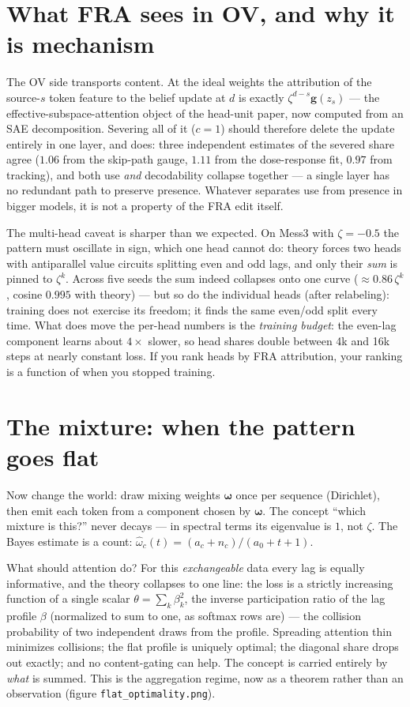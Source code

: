 \documentclass{article}
\newcommand{\gb}{\boldsymbol{g}}
\newcommand{\omegab}{\boldsymbol{\omega}}
\begin{document}
\section{What FRA sees in OV, and why it is mechanism}

The OV side transports content. At the ideal weights the attribution of the
source-$s$ token feature to the belief update at $d$ is exactly
$\zeta^{d-s}\gb(z_s)$ --- the effective-subspace-attention object of the
head-unit paper, now computed from an SAE decomposition. Severing all of it
($c=1$) should therefore delete the update entirely in one layer, and does:
three independent estimates of the severed share agree ($1.06$ from the
skip-path gauge, $1.11$ from the dose-response fit, $0.97$ from tracking),
and both use \emph{and} decodability collapse together --- a single layer
has no redundant path to preserve presence. Whatever separates use from
presence in bigger models, it is not a property of the FRA edit itself.

The multi-head caveat is sharper than we expected. On Mess3 with
$\zeta = -0.5$ the pattern must oscillate in sign, which one head cannot do:
theory forces two heads with antiparallel value circuits splitting even and
odd lags, and only their \emph{sum} is pinned to $\zeta^k$. Across five
seeds the sum indeed collapses onto one curve ($\approx 0.86\,\zeta^k$,
cosine $0.995$ with theory) --- but so do the individual heads (after
relabeling): training does not exercise its freedom; it finds the same
even/odd split every time. What does move the per-head numbers is the
\emph{training budget}: the even-lag component learns about $4\times$
slower, so head shares double between 4k and 16k steps at nearly constant
loss. If you rank heads by FRA attribution, your ranking is a function of
when you stopped training.

\section{The mixture: when the pattern goes flat}

Now change the world: draw mixing weights $\omegab$ once per sequence
(Dirichlet), then emit each token from a component chosen by $\omegab$.
The concept ``which mixture is this?'' never decays --- in spectral terms
its eigenvalue is $1$, not $\zeta$. The Bayes estimate is a count:
$\hat\omega_c(t) = (a_c + n_c)/(a_0 + t + 1)$.

What should attention do? For this \emph{exchangeable} data every lag is
equally informative, and the theory collapses to one line: the loss is a
strictly increasing function of a single scalar
$\theta = \sum_k \beta_k^2$, the inverse participation ratio of the lag
profile $\beta$ (normalized to sum to one, as softmax rows are) --- the
collision probability of two independent draws from
the profile. Spreading attention thin minimizes collisions; the flat
profile is uniquely optimal; the diagonal share drops out exactly; and no
content-gating can help. The concept is carried entirely by \emph{what} is
summed. This is the aggregation regime, now as a theorem rather than an
observation (figure \texttt{flat\_optimality.png}).
\end{document}
